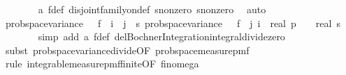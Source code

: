 \begin{isabellebody}
\ \ \ \ \ \ \isamarkupfalse%
\ a\ f{}{\isacharunderscore}{\kern0pt}def\ disjoint{\isacharunderscore}{\kern0pt}family{\isacharunderscore}{\kern0pt}on{\isacharunderscore}{\kern0pt}def\ s{}{\isacharunderscore}{\kern0pt}nonzero\ s{}{\isacharunderscore}{\kern0pt}nonzero\ \isamarkupfalse%
\ auto\isanewline
\isanewline
\ \ \ \ \isamarkupfalse%
\ {\isachardoublequoteopen}prob{\isacharunderscore}{\kern0pt}space{\isachardot}{\kern0pt}variance\ {\isasymOmega}\ {\isacharparenleft}{\kern0pt}{\isasymlambda}{\isasymomega}{\isachardot}{\kern0pt}\ f{}\ {\isasymomega}\ i{\isacharparenright}{\kern0pt}\ {\isacharequal}{\kern0pt}\ {\isacharparenleft}{\kern0pt}{\isasymSum}j\ {\isacharequal}{\kern0pt}\ {}{\isachardot}{\kern0pt}{\isachardot}{\kern0pt}{\isacharless}{\kern0pt}s\ prob{\isacharunderscore}{\kern0pt}space{\isachardot}{\kern0pt}variance\ {\isasymOmega}\ {\isacharparenleft}{\kern0pt}{\isasymlambda}{\isasymomega}{\isachardot}{\kern0pt}\ f{}\ {\isasymomega}\ j\ i{\isacharparenright}{\kern0pt}{\isacharparenright}{\kern0pt}\ {\isacharslash}{\kern0pt}\ {\isacharparenleft}{\kern0pt}{\isacharparenleft}{\kern0pt}{\isacharparenleft}{\kern0pt}real\ p{\isacharparenright}{\kern0pt}\ {\isacharminus}{\kern0pt}\ {}{\isacharparenright}{\kern0pt}\ {\isacharasterisk}{\kern0pt}\ real\ s\isanewline
\ \ \ \ \ \ \isamarkupfalse%
\ {\isacharparenleft}{\kern0pt}simp\ add{\isacharcolon}{\kern0pt}\ a\ f{}{\isacharunderscore}{\kern0pt}def\ del{\isacharcolon}{\kern0pt}Bochner{\isacharunderscore}{\kern0pt}Integration{\isachardot}{\kern0pt}integral{\isacharunderscore}{\kern0pt}divide{\isacharunderscore}{\kern0pt}zero{\isacharparenright}{\kern0pt}\isanewline
\ \ \ \ \ \ \isamarkupfalse%
\ {\isacharparenleft}{\kern0pt}subst\ prob{\isacharunderscore}{\kern0pt}space{\isachardot}{\kern0pt}variance{\isacharunderscore}{\kern0pt}divide{\isacharbrackleft}{\kern0pt}OF\ prob{\isacharunderscore}{\kern0pt}space{\isacharunderscore}{\kern0pt}measure{\isacharunderscore}{\kern0pt}pmf{\isacharbrackright}{\kern0pt}{\isacharparenright}{\kern0pt}\isanewline
\ \ \ \ \ \ \ \isamarkupfalse%
\ {\isacharparenleft}{\kern0pt}rule\ integrable{\isacharunderscore}{\kern0pt}measure{\isacharunderscore}{\kern0pt}pmf{\isacharunderscore}{\kern0pt}finite{\isacharbrackleft}{\kern0pt}OF\ fin{\isacharunderscore}{\kern0pt}omega{\isacharunderscore}{\kern0pt}{}{\isacharbrackright}{\kern0pt}{\isacharparenright}{\kern0pt}\isanewline

\end{isabellebody}
